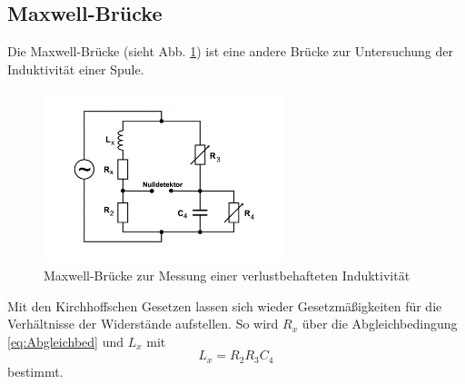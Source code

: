     \subsection{Maxwell-Brücke}
    Die Maxwell-Brücke (sieht Abb. \ref{fig:Maxwell_Bruecke}) ist eine andere Brücke zur Untersuchung der Induktivität einer Spule.
    \begin{figure}
        \centering
        \includegraphics[height= 5cm]{Messdaten/Maxwell.jpg}
        \caption{Maxwell-Brücke zur Messung einer verlustbehafteten Induktivität}
        \label{fig:Maxwell_Bruecke}
    \end{figure}
    Mit den Kirchhoffschen Gesetzen lassen sich wieder Gesetzmäßigkeiten für die Verhältnisse der Widerstände aufstellen.
    So wird $R_x$ über die Abgleichbedingung \eqref{eq:Abgleichbed} und $L_x$ mit
    \begin{equation}
        L_x = R_2 R_3 C_4
        \label{eq:maxwell}
    \end{equation}
    bestimmt.
